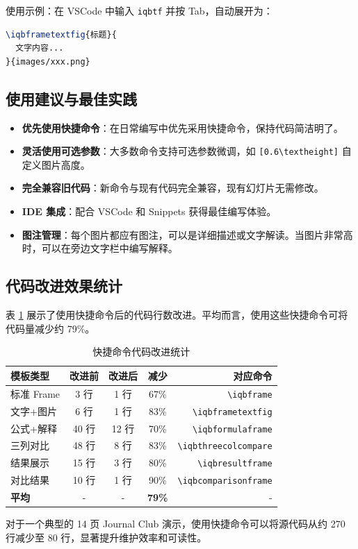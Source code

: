 使用示例：在 VSCode 中输入 \lstinline|iqbtf| 并按 Tab，自动展开为：

\begin{lstlisting}[style=blockstyle,language=TeX]
\iqbframetextfig{标题}{
  文字内容...
}{images/xxx.png}
\end{lstlisting}

\subsection{使用建议与最佳实践}

\begin{itemize}
\item \textbf{优先使用快捷命令}：在日常编写中优先采用快捷命令，保持代码简洁明了。
\item \textbf{灵活使用可选参数}：大多数命令支持可选参数微调，如 \lstinline|[0.6\textheight]| 自定义图片高度。
\item \textbf{完全兼容旧代码}：新命令与现有代码完全兼容，现有幻灯片无需修改。
\item \textbf{IDE 集成}：配合 VSCode 和 Snippets 获得最佳编写体验。
\item \textbf{图注管理}：每个图片都应有图注，可以是详细描述或文字解读。当图片非常高时，可以在旁边文字栏中编写解释。
\end{itemize}

\subsection{代码改进效果统计}

表 \ref{tab:code-improvement} 展示了使用快捷命令后的代码行数改进。平均而言，使用这些快捷命令可将代码量减少约 79\%。

\begin{table}[!h]
\centering
\caption{快捷命令代码改进统计}
\label{tab:code-improvement}
\begin{tabular}{lcccr}
\toprule
\textbf{模板类型} & \textbf{改进前} & \textbf{改进后} & \textbf{减少} & \textbf{对应命令} \\
\midrule
标准 Frame & 3 行 & 1 行 & 67\% & \lstinline|\iqbframe| \\
文字+图片 & 6 行 & 1 行 & 83\% & \lstinline|\iqbframetextfig| \\
公式+解释 & 40 行 & 12 行 & 70\% & \lstinline|\iqbformulaframe| \\
三列对比 & 48 行 & 8 行 & 83\% & \lstinline|\iqbthreecolcompare| \\
结果展示 & 15 行 & 3 行 & 80\% & \lstinline|\iqbresultframe| \\
对比结果 & 10 行 & 1 行 & 90\% & \lstinline|\iqbcomparisonframe| \\
\midrule
\textbf{平均} & - & - & \textbf{79\%} & - \\
\bottomrule
\end{tabular}
\end{table}

对于一个典型的 14 页 Journal Club 演示，使用快捷命令可以将源代码从约 270 行减少至 80 行，显著提升维护效率和可读性。